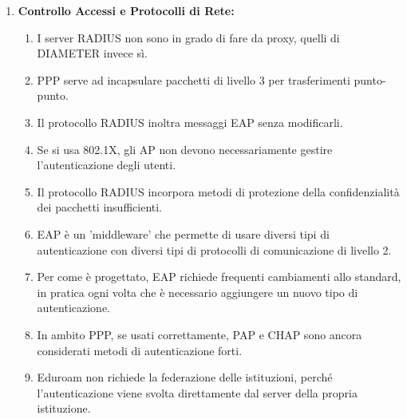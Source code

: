 \documentclass[11pt,a4paper]{article}
\begin{document}
\begin{questionbox}
\begin{enumerate}[label=\textbf{1.\arabic*}]
    \item \textbf{Controllo Accessi e Protocolli di Rete:}
    \begin{enumerate}[label=\alph*.]
        \item I server RADIUS non sono in grado di fare da proxy, quelli di DIAMETER invece s\`i.
        \item PPP serve ad incapsulare pacchetti di livello 3 per trasferimenti punto-punto.
        \item Il protocollo RADIUS inoltra messaggi EAP senza modificarli.
        \item Se si usa 802.1X, gli AP non devono necessariamente gestire l'autenticazione degli utenti.
        \item Il protocollo RADIUS incorpora metodi di protezione della confidenzialit\`a dei pacchetti insufficienti.
        \item EAP \`e un 'middleware' che permette di usare diversi tipi di autenticazione con diversi tipi di protocolli di comunicazione di livello 2.
        \item Per come \`e progettato, EAP richiede frequenti cambiamenti allo standard, in pratica ogni volta che \`e necessario aggiungere un nuovo tipo di autenticazione.
        \item In ambito PPP, se usati correttamente, PAP e CHAP sono ancora considerati metodi di autenticazione forti.
        \item Eduroam non richiede la federazione delle istituzioni, perch\'e l'autenticazione viene svolta direttamente dal server della propria istituzione.
    \end{enumerate}


\end{enumerate}
\end{questionbox}
\end{document}
